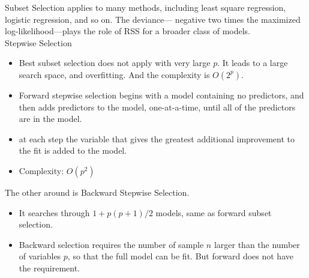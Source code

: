 \documentclass[11pt, a4paper]{article}
\begin{document}
Subset Selection applies to many methods, including least square regression, logistic regression, and so on. The deviance--- negative two times the maximized log-likelihood---plays the role of RSS for a broader class of models.\\[1mm]
Stepwise Selection
\begin{itemize}
\item Best subset selection does not apply with very large $p$. It leads to a large search space, and overfitting. And the complexity is $O(2^p)$.
\item Forward stepwise selection begins with a model containing no predictors, and then adds predictors to the model, one-at-a-time, until all of the predictors are in the model.
\item at each step the variable that gives the greatest additional improvement to the fit is added to the model.
\item Complexity: $O(p^2)$
\end{itemize}
The other around is Backward Stepwise Selection.
\begin{itemize}
  \item It searches through $1+p(p+1)/2$ models, same as forward subset selection.
  \item Backward selection requires the number of sample $n$ larger than the number of variables $p$, so that the full model can be fit. But forward does not have the requirement.
  \end{itemize}
\end{document}
